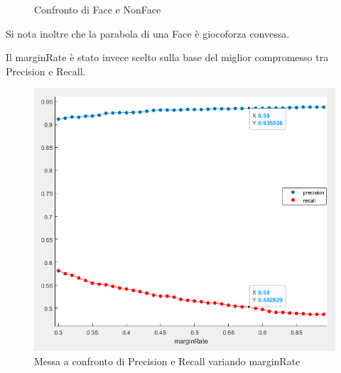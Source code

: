 \documentclass[
  italian,
]{article}
\begin{document}
\begin{figure}
\centering
{}%
\qquad
{}%
\caption{Confronto di Face e NonFace}
\end{figure}


Si nota inoltre che la parabola di una Face è giocoforza convessa.

Il marginRate è stato invece scelto sulla base del miglior compromesso
tra Precision e Recall.

\begin{figure}
\centering
\includegraphics[width=\textwidth,height=0.31\textheight]{img/testingGraph.png}
\caption{Messa a confronto di Precision e Recall variando marginRate}
\end{figure}
\end{document}

